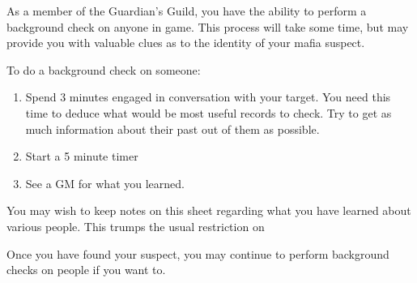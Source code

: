 \documentclass[green]{NeptuneBall}
\begin{document}
\name{\gBackground{}}

As a member of the Guardian's Guild, you have the ability to perform a background check on anyone in game. This process will take some time, but may provide you with valuable clues as to the identity of your mafia suspect.

To do a background check on someone:
\begin{enumerate}
\item Spend 3 minutes engaged in conversation with your target. You need this time to deduce what would be most useful records to check. Try to get as much information about their past out of them as possible.
\item Start a 5 minute timer
\item See a GM for what you learned.
\end{enumerate}

You may wish to keep notes on this sheet regarding what you have learned about various people. This trumps the usual restriction on 

Once you have found your suspect, you may continue to perform background checks on people if you want to.
\end{document}
